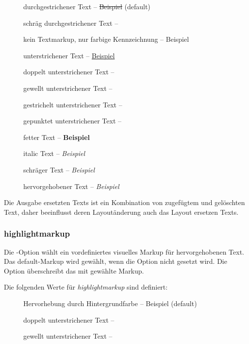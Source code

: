 \begin{description}
	\item [] durchgestrichener Text -- \sout{Beispiel} (default)
	\item [] schräg durchgestrichener Text -- 
	\item [] kein Textmarkup, nur farbige Kennzeichnung -- {\color{orange} Beispiel}
	\item [] unterstrichener Text -- \uline{Beispiel}
	\item [] doppelt unterstrichener Text -- 
	\item [] gewellt unterstrichener Text -- 
	\item [] gestrichelt unterstrichener Text -- 
	\item [] gepunktet unterstrichener Text -- 
	\item [] fetter Text -- \textbf{Beispiel}
	\item [] italic Text -- \textit{Beispiel}
	\item [] schräger Text -- \textsl{Beispiel}
	\item [] hervorgehobener Text -- \emph{Beispiel}
\end{description}

Die Ausgabe ersetzten Texts ist ein Kombination von zugefügtem und gelöschten Text, daher beeinflusst deren Layoutänderung auch das Layout ersetzen Texts.



\subsubsection{highlightmarkup}


Die -Option wählt ein vordefiniertes visuelles Markup für hervorgehobenen Text.
Das default-Markup wird gewählt, wenn die Option nicht gesetzt wird.
Die Option  überschreibt das mit  gewählte Markup.

Die folgenden Werte für \emph{highlightmarkup} sind definiert:

\begin{description}
	\item [] Hervorhebung durch Hintergrundfarbe -- \colorbox{orange!30}{Beispiel} (default)
	\item [] doppelt unterstrichener Text -- 
	\item [] gewellt unterstrichener Text -- 
\end{description}

